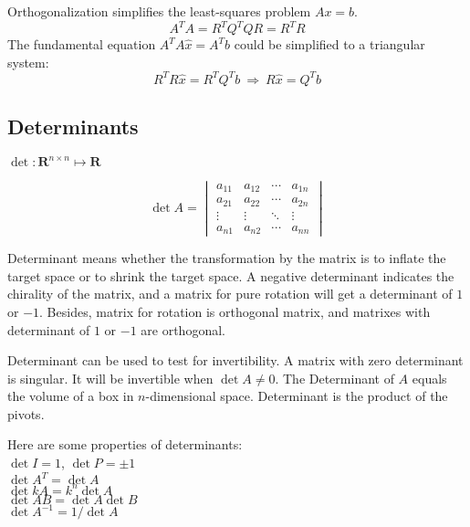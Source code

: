  Orthogonalization simplifies the least-squares problem $Ax=b$.
 $$A^TA = R^TQ^TQR = R^TR$$
 The fundamental equation $A^TA\hat{x} = A^Tb$ could be simplified to a triangular system:
 $$R^TR\hat{x}=R^TQ^Tb ~\Rightarrow ~ R\hat{x} = Q^Tb$$



\subsection{Determinants}

 $\det: \mathbf{R}^{n\times n} \mapsto \mathbf{R}$

 $$
 \det A =
 \begin{vmatrix}
   a_{11} & a_{12} & \cdots & a_{1n} \\
   a_{21} & a_{22} & \cdots & a_{2n} \\
   \vdots & \vdots & \ddots & \vdots \\
   a_{n1} & a_{n2} & \cdots & a_{nn}
 \end{vmatrix}
 $$

 Determinant means whether the transformation by the matrix is to
 inflate the target space or to shrink the target space.
 A negative determinant indicates the chirality of the matrix,
 and a matrix for pure rotation will get a determinant of $1$ or $-1$.
 Besides, matrix for rotation is orthogonal matrix, and matrixes
 with determinant of $1$ or $-1$ are orthogonal.

 Determinant can be used to test for invertibility. A matrix with zero
 determinant is singular. It will be invertible when $\det A \neq 0$.
 The Determinant of $A$ equals the volume of a box in $n$-dimensional space.
 Determinant is the product of the pivots.

 Here are some properties of determinants:\\
 $\det I = 1$, $\det P = \pm 1$\\
 $\det A^T = \det A $\\
 $\det kA = k^n \det A$\\
 $\det AB = \det A \det B$\\
 $\det A^{-1} = 1 / \det A$

